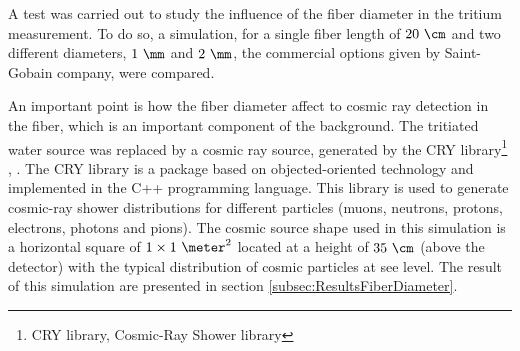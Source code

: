 A test was carried out to study the influence of the fiber diameter in the tritium measurement. To do so, a simulation, for a single fiber length of $20~\cm$ and two different diameters, $1~\mm$ and $2~\mm$, the commercial options given by Saint-Gobain company, were compared.

An important point is how the fiber diameter affect to cosmic ray detection in the fiber, which is an important component of the background. The tritiated water source was replaced by a cosmic ray source, generated by the CRY library\footnote{CRY library, Cosmic-Ray Shower library} \cite{CRYwebsite}, \cite{CRYpaper}. The CRY library is a package based on objected-oriented technology and implemented in the C++ programming language. This library is used to generate cosmic-ray shower distributions for different particles (muons, neutrons, protons, electrons, photons and pions). The cosmic source shape used in this simulation is a horizontal square of $1 \times 1~\meter ^2$ located at a height of $35~\cm$ (above the detector) with the typical distribution of cosmic particles at see level. The result of this simulation are presented in section \ref{subsec:ResultsFiberDiameter}.